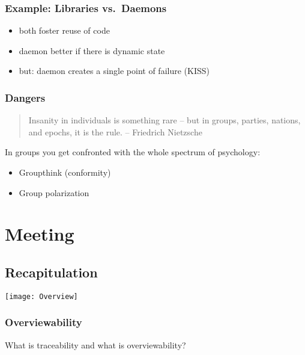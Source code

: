 \begin{frame}
	\frametitle{Example: Libraries vs.\ Daemons}

	\begin{itemize}[<+-| alert@+>]
	\item both foster reuse of code
	\item daemon better if there is dynamic state
	\item but: daemon creates a single point of failure (KISS)
	\end{itemize}
\end{frame}

\begin{frame}
	\frametitle{Dangers}

	\begin{quote}
	Insanity in individuals is something rare -- but in groups, parties, nations, and epochs, it is the rule.
	-- Friedrich Nietzsche
	\end{quote}

	In groups you get confronted with the whole spectrum of psychology:

	\pause

	\begin{itemize}[<+-| alert@+>]
	\item Groupthink (conformity)
	\item Group polarization
	\end{itemize}
\end{frame}



\section{Meeting}

\subsection{Recapitulation}


\begin{frame}
	\texttt{[image: Overview]}
\end{frame}


\begin{assignment}
	\frametitle{Overviewability}

	What is traceability and what is overviewability?
\end{assignment}

